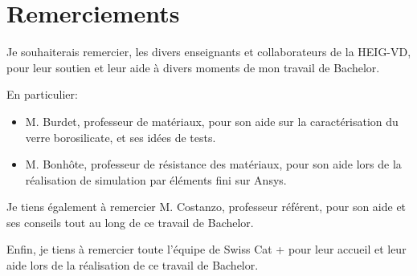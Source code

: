 \newpage
\section*{Remerciements}

Je souhaiterais remercier, les divers enseignants et collaborateurs de la HEIG-VD, pour leur soutien et leur aide à divers moments 
de mon travail de Bachelor.

En particulier:
\begin{itemize}[label=\textbullet]
    \item M. Burdet, professeur de matériaux, pour son aide sur la caractérisation du verre
borosilicate, et ses idées de tests.
    \item M. Bonhôte, professeur de résistance des matériaux,  pour son aide lors de la réalisation 
de simulation par éléments fini sur Ansys.
\end{itemize}

\vspace{0.3 cm}
Je tiens également à remercier M. Costanzo, professeur référent, pour son aide et ses conseils tout au long de ce travail de Bachelor.

\vspace{0.3 cm}
Enfin, je tiens à remercier toute l'équipe de Swiss Cat + pour leur 
accueil et leur aide lors de la réalisation de ce travail de Bachelor.